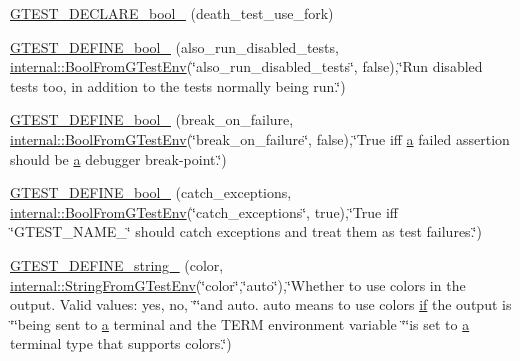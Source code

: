 \begin{DoxyCompactItemize}
\item 
\hyperlink{namespacetesting_a534f0743e7c42c55d27dcd0dd3d38f18}{G\+T\+E\+S\+T\+\_\+\+D\+E\+C\+L\+A\+R\+E\+\_\+bool\+\_\+} (death\+\_\+test\+\_\+use\+\_\+fork)
\item 
\hyperlink{namespacetesting_aaead7d1aa21cf4a222e10e4c91c21ee5}{G\+T\+E\+S\+T\+\_\+\+D\+E\+F\+I\+N\+E\+\_\+bool\+\_\+} (also\+\_\+run\+\_\+disabled\+\_\+tests, \hyperlink{namespacetesting_1_1internal_a67132cdce23fb71b6c38ee34ef81eb4c}{internal\+::\+Bool\+From\+G\+Test\+Env}(\char`\"{}also\+\_\+run\+\_\+disabled\+\_\+tests\char`\"{}, false),\char`\"{}Run disabled tests too, in addition to the tests normally being run.\char`\"{})
\item 
\hyperlink{namespacetesting_a5c9316c2f726f836c50fcfc1065d718c}{G\+T\+E\+S\+T\+\_\+\+D\+E\+F\+I\+N\+E\+\_\+bool\+\_\+} (break\+\_\+on\+\_\+failure, \hyperlink{namespacetesting_1_1internal_a67132cdce23fb71b6c38ee34ef81eb4c}{internal\+::\+Bool\+From\+G\+Test\+Env}(\char`\"{}break\+\_\+on\+\_\+failure\char`\"{}, false),\char`\"{}True iff \hyperlink{_07copy_08_2_read_camera_model_8m_a551a3d351eadcc0b9b1a2f24f0fb5ea0}{a} failed assertion should be \hyperlink{_07copy_08_2_read_camera_model_8m_a551a3d351eadcc0b9b1a2f24f0fb5ea0}{a} debugger break-\/point.\char`\"{})
\item 
\hyperlink{namespacetesting_a16f63f28356f1843888013487da9f89d}{G\+T\+E\+S\+T\+\_\+\+D\+E\+F\+I\+N\+E\+\_\+bool\+\_\+} (catch\+\_\+exceptions, \hyperlink{namespacetesting_1_1internal_a67132cdce23fb71b6c38ee34ef81eb4c}{internal\+::\+Bool\+From\+G\+Test\+Env}(\char`\"{}catch\+\_\+exceptions\char`\"{}, true),\char`\"{}True iff \char`\"{}G\+T\+E\+S\+T\+\_\+\+N\+A\+M\+E\+\_\+\char`\"{} should catch exceptions and treat them as test failures.\char`\"{})
\item 
\hyperlink{namespacetesting_a00b4a4eabdef5927208aeabd81220069}{G\+T\+E\+S\+T\+\_\+\+D\+E\+F\+I\+N\+E\+\_\+string\+\_\+} (color, \hyperlink{namespacetesting_1_1internal_ac54dabc540bf79c2de91add679bfb93b}{internal\+::\+String\+From\+G\+Test\+Env}(\char`\"{}color\char`\"{},\char`\"{}auto\char`\"{}),\char`\"{}Whether to use colors in the output.  Valid values\+: yes, no, \char`\"{}\char`\"{}and auto.  \textquotesingle{}auto\textquotesingle{} means to use colors \hyperlink{jquery_8js_a42cbfadee2b4749e8f699ea8d745a0e4}{if} the output is \char`\"{}\char`\"{}being sent to \hyperlink{_07copy_08_2_read_camera_model_8m_a551a3d351eadcc0b9b1a2f24f0fb5ea0}{a} terminal and the T\+E\+RM environment variable \char`\"{}\char`\"{}is set to \hyperlink{_07copy_08_2_read_camera_model_8m_a551a3d351eadcc0b9b1a2f24f0fb5ea0}{a} terminal type that supports colors.\char`\"{})

\end{DoxyCompactItemize}
